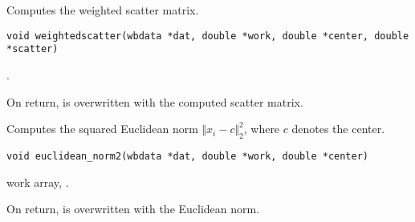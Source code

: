 \documentclass[a4paper,oneside,10pt,DIV=12]{scrreprt}
\begin{document}
\begin{Description}
Computes the weighted scatter matrix.
\end{Description}
\begin{Usage}
\begin{verbatim}
void weightedscatter(wbdata *dat, double *work, double *center, double *scatter)
\end{verbatim}
\end{Usage}
\begin{Arguments}
	\begin{ldescription}
		\WBDATA
		\CENTER
		\SCATTER
	\end{ldescription}
\end{Arguments}
\begin{Dependency}
.
\end{Dependency}
\begin{Value}
On return,  is overwritten with the computed scatter matrix.
\end{Value}

\begin{Description}
Computes the squared Euclidean norm $\Vert x_i - c \Vert_2^2$, where $c$ denotes
the center. 
\end{Description}
\begin{Usage}
\begin{verbatim}
void euclidean_norm2(wbdata *dat, double *work, double *center)
\end{verbatim}
\end{Usage}
\begin{Arguments}
	\begin{ldescription}
		\WBDATA
		\item[\code{work}] work array, \code{double array[n, p]}.
		\CENTER
	\end{ldescription}
\end{Arguments}
\begin{Value}
On return,  is overwritten with the Euclidean norm.
\end{Value}
\end{document}
